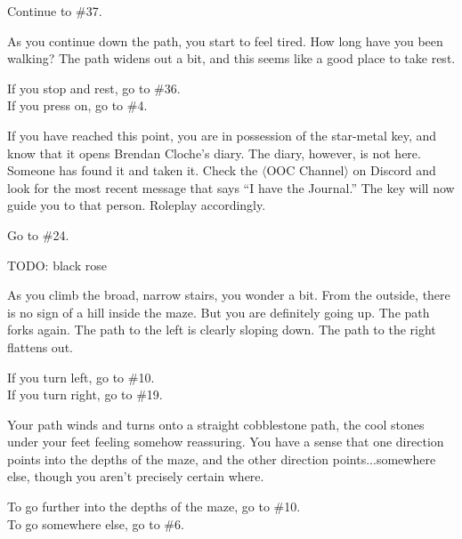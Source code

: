 \documentclass[green]{gl2018}
\begin{document}
\begin{large}
\begin{location}{19}
\begin{fromhere}  Continue to \#37.\end{fromhere}
\end{location}
\begin{location}{20}
As you continue down the path, you start to feel tired. How long have you been walking? The path widens out a bit, and this seems like a good place to take rest.
\begin{fromhere} If you stop and rest, go to \#36.\\
 If you press on, go to \#4.
\end{fromhere}
\end{location}
\begin{location}{21}
If you have reached this point, you are in possession of the star-metal key, and know that it opens Brendan Cloche's diary. The diary, however, is not here. Someone has found it and taken it. Check the $\langle$OOC Channel$\rangle$ on Discord and look for the most recent message that says “I have the Journal.” The key will now guide you to that person.  Roleplay accordingly. 
\begin{fromhere}Go to \#24.\end{fromhere}
\end{location}
\begin{location}{22}
TODO: black rose
\end{location}
\begin{location}{23}
As you climb the broad, narrow stairs, you wonder a bit. From the outside, there is no sign of a hill inside the maze. But you are definitely going up. The path forks again. The path to the left is clearly sloping down. The path to the right flattens out.
\begin{fromhere} If you turn left, go to \#10.\\ If you turn right,  go to \#19.\end{fromhere}
\end{location}
\begin{location}{24}
Your path winds and turns onto a straight cobblestone path, the cool stones under your feet feeling somehow reassuring.  You have a sense that one direction points into the depths of the maze, and the other direction points...somewhere else, though you aren't precisely certain where.  
\begin{fromhere}To go further into the depths of the maze, go to \#10.\\  To go somewhere else, go to \#6.\end{fromhere}

\end{location}
\end{large}
\end{document}
